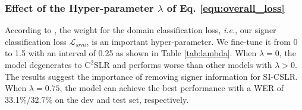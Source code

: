 \documentclass[acmsmall,screen]{acmart}
\def\ie{\emph{i.e.}} \def\Ie{\emph{I.e.}}
\begin{document}
\subsubsection{Effect of the Hyper-parameter $\lambda$ of Eq. \ref{equ:overall_loss}}
\label{sec:lambda}
According to \cite{liu2018exploring}, the weight for the domain classification loss, \ie, our signer classification loss $\mathcal{L}_{srm}$, is an important hyper-parameter.
We fine-tune it from 0 to 1.5 with an interval of 0.25 as shown in Table \ref{tab:lambda}.
When $\lambda=0$, the model degenerates to $\text{C}^2$SLR and performs worse than other models with $\lambda>0$.
The results suggest the importance of removing signer information for SI-CSLR.
When $\lambda=0.75$, the model can achieve the best performance with a WER of 33.1\%/32.7\% on the dev and test set, respectively.
\end{document}
